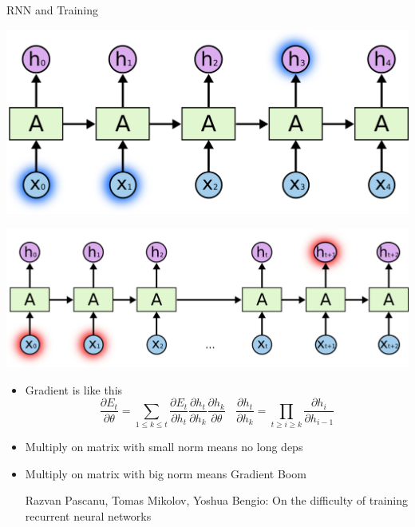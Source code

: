 \documentclass{beamer}
\begin{document}
\begin{frame}{RNN and Training}
	\begin{center}
		 \includegraphics[scale=0.18]{./img/rnn_st}
		
		 \includegraphics[scale=0.18]{./img/rnn_lt}
	\end{center}
	\begin{itemize}
		 \item Gradient is like this 
				  $$\frac{\partial E_t}{\partial \theta} = 
				\sum_{1 \leq k \leq  t}  \frac{\partial E_t}{\partial h_t} \frac{\partial h_t}{\partial h_k}
				\frac{\partial h_k}{\partial \theta} ~~~~\frac{\partial h_t}{\partial h_k} = \prod_{t\geq i \geq k} \frac{\partial h_i}{\partial h_{i-1}}$$		
		 \item Multiply on matrix with small norm means no long deps
		 \item Multiply on matrix with big norm means Gradient Boom
		
	 	\vspace{0.5cm}
		{\tiny Razvan Pascanu, Tomas Mikolov, Yoshua Bengio: On the difficulty of training recurrent neural networks}
	\end{itemize} 
\end{frame}
\end{document}
